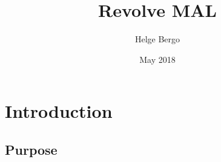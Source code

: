 \documentclass{article}
\title{Revolve MAL}
\author{Helge Bergo}
\date{May 2018}
\begin{document}

\tableofcontents

\newpage
\section{Introduction}

\subsection{Purpose}
\end{document}
